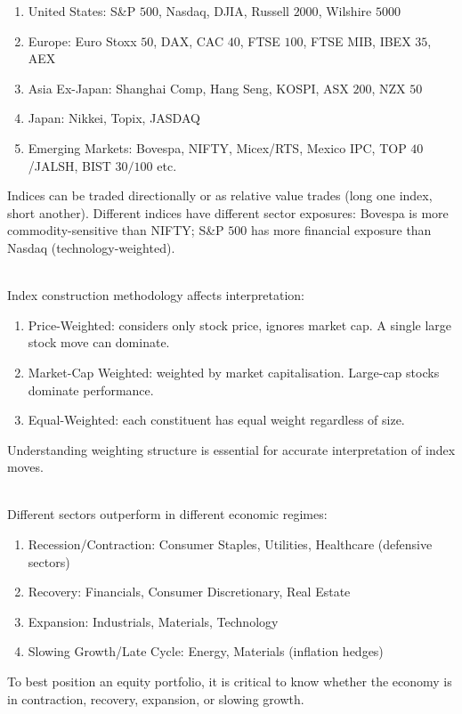 \documentclass[a4paper,oneside,openany]{book}
\begin{document}
\begin{remark} 
\begin{enumerate}[label=\roman*.]
\setlength{\itemsep}{0pt}
\item United States: S\&P $500$, Nasdaq, DJIA, Russell $2000$, Wilshire $5000$
\item Europe: Euro Stoxx $50$, DAX, CAC $40$, FTSE $100$, FTSE MIB, IBEX $35$, AEX
\item Asia Ex-Japan: Shanghai Comp, Hang Seng, KOSPI, ASX $200$, NZX $50$
\item Japan: Nikkei, Topix, JASDAQ
\item Emerging Markets: Bovespa, NIFTY, Micex/RTS, Mexico IPC, TOP $40$/JALSH, BIST $30/100$ etc.
\end{enumerate}
Indices can be traded directionally or as relative value trades (long one index, short another). Different indices have different sector exposures: Bovespa is more commodity-sensitive than NIFTY; S\&P $500$ has more financial exposure than Nasdaq (technology-weighted).
\end{remark}

\begin{remark} \\
Index construction methodology affects interpretation:
\begin{enumerate}[label=\roman*.]
\setlength{\itemsep}{0pt}
\item Price-Weighted: considers only stock price, ignores market cap. A single large stock move can dominate.
\item Market-Cap Weighted: weighted by market capitalisation. Large-cap stocks dominate performance.
\item Equal-Weighted: each constituent has equal weight regardless of size.
\end{enumerate}
Understanding weighting structure is essential for accurate interpretation of index moves.
\end{remark}

\begin{remark} \\
Different sectors outperform in different economic regimes:
\begin{enumerate}[label=\roman*.]
\setlength{\itemsep}{0pt}
\item Recession/Contraction: Consumer Staples, Utilities, Healthcare (defensive sectors)
\item Recovery: Financials, Consumer Discretionary, Real Estate
\item Expansion: Industrials, Materials, Technology
\item Slowing Growth/Late Cycle: Energy, Materials (inflation hedges)
\end{enumerate}
To best position an equity portfolio, it is critical to know whether the economy is in contraction, recovery, expansion, or slowing growth.
\end{remark}
\end{document}
